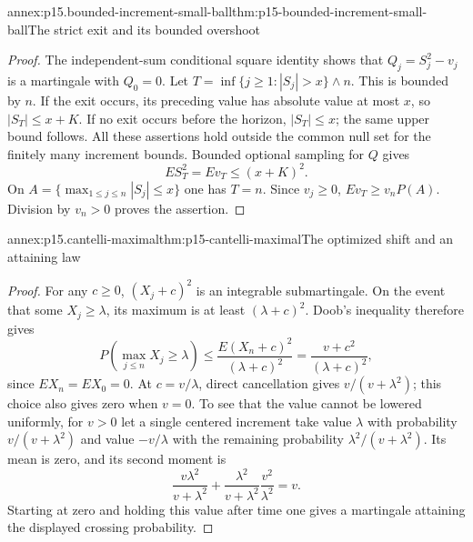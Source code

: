 \begin{annexitem}{annex:p15.bounded-increment-small-ball}{thm:p15-bounded-increment-small-ball}{The strict exit and its bounded overshoot}
\begin{proof}
The independent-sum conditional square identity shows that
\(Q_j=S_j^2-v_j\) is a martingale with \(Q_0=0\).
Let \(T=\inf\{j\geq1:|S_j|>x\}\wedge n\).
This is bounded by \(n\). If the exit occurs, its preceding
value has absolute value at most \(x\), so \(|S_T|\leq x+K\).
If no exit occurs before the horizon, \(|S_T|\leq x\);
the same upper bound follows.
All these assertions hold outside the common null set for
the finitely many increment bounds.
Bounded optional sampling for \(Q\) gives
\[
                              ES_T^2=Ev_T\leq(x+K)^2.
\]
On \(A=\{\max_{1\leq j\leq n}|S_j|\leq x\}\) one has \(T=n\).
Since \(v_j\geq0\), \(Ev_T\geq v_nP(A)\).
Division by \(v_n>0\) proves the assertion.
\end{proof}
\end{annexitem}

\begin{annexitem}{annex:p15.cantelli-maximal}{thm:p15-cantelli-maximal}{The optimized shift and an attaining law}
\begin{proof}
For any \(c\geq0\), \((X_j+c)^2\) is an integrable submartingale.
On the event that some \(X_j\geq\lambda\), its maximum is at least
\((\lambda+c)^2\). Doob's inequality therefore gives
\[
 P(\max_{j\leq n}X_j\geq\lambda)
          \leq\frac{E(X_n+c)^2}{(\lambda+c)^2}
          =\frac{v+c^2}{(\lambda+c)^2},
\]
since \(EX_n=EX_0=0\).
At \(c=v/\lambda\), direct cancellation gives
\(v/(v+\lambda^2)\); this choice also gives zero when \(v=0\).
To see that the value cannot be lowered uniformly, for \(v>0\)
let a single centered increment take value \(\lambda\) with
probability \(v/(v+\lambda^2)\) and value \(-v/\lambda\)
with the remaining probability \(\lambda^2/(v+\lambda^2)\).
Its mean is zero, and its second moment is
\[
 \frac{v\lambda^2}{v+\lambda^2}
        +\frac{\lambda^2}{v+\lambda^2}\frac{v^2}{\lambda^2}=v.
\]
Starting at zero and holding this value after time one gives
a martingale attaining the displayed crossing probability.
\end{proof}
\end{annexitem}

